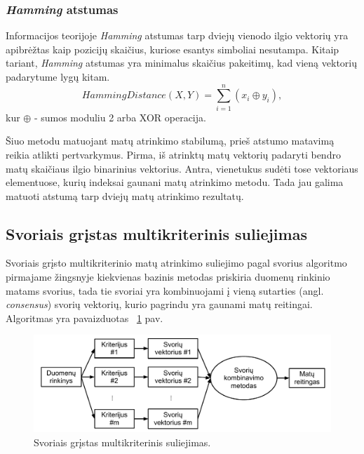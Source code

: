\subsubsection{\textit{Hamming} atstumas}

Informacijos teorijoje \textit{Hamming} atstumas \cite{hamming1950error} tarp dviejų vienodo ilgio vektorių yra apibrėžtas kaip pozicijų skaičius, kuriose esantys simboliai nesutampa. Kitaip tariant, \textit{Hamming} atstumas yra minimalus skaičius pakeitimų, kad vieną vektorių padarytume lygų kitam. 
\begin{equation}
\label{hamming_distance}
 Hamming Distance(X, Y)= \sum_{i=1}^{n} (x_i \oplus y_i),
\end{equation}
kur $\oplus$ - sumos moduliu 2 arba XOR operacija.

Šiuo metodu matuojant matų atrinkimo stabilumą, prieš atstumo matavimą reikia atlikti pertvarkymus. Pirma, iš atrinktų matų vektorių padaryti bendro matų skaičiaus ilgio binarinius vektorius. Antra, vienetukus sudėti tose vektoriaus elementuose, kurių indeksai gaunani matų atrinkimo metodu. Tada jau galima matuoti atstumą tarp dviejų matų atrinkimo rezultatų.

\subsection{Svoriais grįstas multikriterinis suliejimas}

Svoriais grįsto multikriterinio matų atrinkimo suliejimo pagal svorius algoritmo pirmajame žingsnyje kiekvienas bazinis metodas priskiria duomenų rinkinio matams svorius, tada tie svoriai yra kombinuojami į vieną sutarties (angl. \textit{consensus}) svorių vektorių, kurio pagrindu yra gaunami matų reitingai. Algoritmas yra pavaizduotas ~\ref{fig:figure4} pav.
\begin{figure}
 \centering
 \includegraphics[width=1\textwidth]{images/score_based_fusion.pdf}
 \caption{Svoriais grįstas multikriterinis suliejimas.}
 \label{fig:figure4}
\end{figure}

